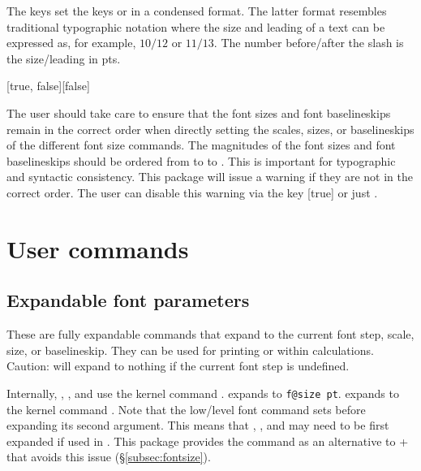 \documentclass{beery}
\begin{document}
The keys  set the keys  or  in a condensed format.
The latter format resembles traditional typographic notation where the size and leading of a text can be expressed as, for example, $10/12$ or $11/13$.
The number before/after the slash is the size/leading in \unit{pts}.

[true, false][false]
\KeepNextPar*

The user should take care to ensure that the font sizes and font baselineskips remain in the correct order when directly setting the scales, sizes, or baselineskips of the different font size commands.
The magnitudes of the font sizes and font baselineskips should be ordered from  to  to .
This is important for typographic and syntactic consistency.
This package will issue a warning if they are not in the correct order.
The user can disable this warning via the key [true] or just .


\section{User commands}
\label{sec:usercommands}

\subsection{Expandable font parameters}
\label{subsec:fontparameters}

\nopagebreak\newline
{}
\newline
{}
\nopagebreak\newline
{}

These are fully expandable commands that expand to the current font step, scale, size, or baselineskip.
They can be used for printing or within calculations.
Caution:  will expand to nothing if the current font step is undefined.

Internally, , , and  use the kernel command .
 expands to \texttt{f@size pt}.
 expands to the kernel command .
Note that the low\-/level font command  sets  before expanding its second argument.
This means that , , and  may need to be first expanded if used in .
This package provides the command  as an alternative to  +  that avoids this issue (\S\ref{subsec:fontsize}).
\end{document}

